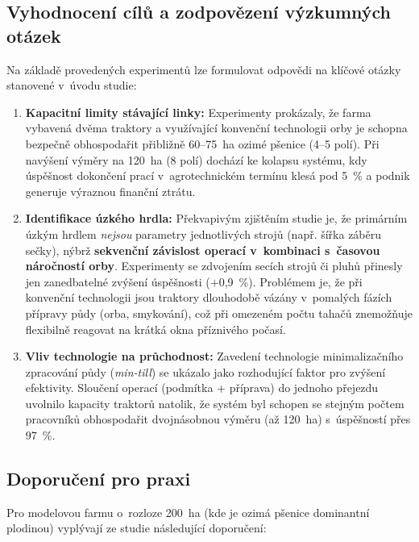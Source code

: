 \documentclass[11pt,a4paper]{article}
\begin{document}
\subsection{Vyhodnocení cílů a zodpovězení výzkumných otázek}

Na základě provedených experimentů lze formulovat odpovědi na klíčové otázky stanovené v~úvodu studie:

\begin{enumerate}
    \item \textbf{Kapacitní limity stávající linky:}
    Experimenty prokázaly, že farma vybavená dvěma traktory a využívající konvenční technologii orby je schopna bezpečně obhospodařit přibližně 60--75~ha ozimé pšenice (4--5 polí). Při navýšení výměry na 120~ha (8 polí) dochází ke kolapsu systému, kdy úspěšnost dokončení prací v~agrotechnickém termínu klesá pod 5~\% a podnik generuje výraznou finanční ztrátu.
    
    \item \textbf{Identifikace úzkého hrdla:}
    Překvapivým zjištěním studie je, že primárním úzkým hrdlem \emph{nejsou} parametry jednotlivých strojů (např. šířka záběru sečky), nýbrž \textbf{sekvenční závislost operací v~kombinaci s~časovou náročností orby}. Experimenty se zdvojením secích strojů či pluhů přinesly jen zanedbatelné zvýšení úspěšnosti ($+$0,9~\%). Problémem je, že při konvenční technologii jsou traktory dlouhodobě vázány v~pomalých fázích přípravy půdy (orba, smykování), což při omezeném počtu tahačů znemožňuje flexibilně reagovat na krátká okna příznivého počasí.
    
    \item \textbf{Vliv technologie na průchodnost:}
    Zavedení technologie minimalizačního zpracování půdy (\emph{min-till}) se ukázalo jako rozhodující faktor pro zvýšení efektivity. Sloučení operací (podmítka + příprava) do jednoho přejezdu uvolnilo kapacity traktorů natolik, že systém byl schopen se stejným počtem pracovníků obhospodařit dvojnásobnou výměru (až 120~ha) s~úspěšností přes 97~\%.
\end{enumerate}

\subsection{Doporučení pro praxi}

Pro modelovou farmu o~rozloze 200~ha (kde je ozimá pšenice dominantní plodinou) vyplývají ze studie následující doporučení:
\end{document}
